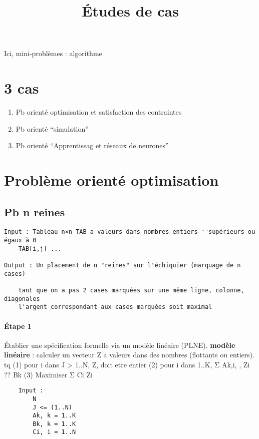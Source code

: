 \documentclass[]{article}
\date{}
\title{Études de cas}
\begin{document}
Ici, mini-problèmes : algorithme

\section{3 cas}\label{cas}

\begin{enumerate}
\def\labelenumi{\arabic{enumi}.}
\tightlist
\item
  Pb orienté optimisation et satisfaction des contraintes
\item
  Pb orienté ``simulation''
\item
  Pb orienté ``Apprentissag et réseaux de neurones''
\end{enumerate}

\section{Problème orienté
optimisation}\label{probluxe8me-orientuxe9-optimisation}

\subsection{Pb n reines}\label{pb-n-reines}

\begin{verbatim}
Input : Tableau n×n TAB a valeurs dans nombres entiers ̛̛supérieurs ou égaux à 0
    TAB[i,j] ...

Output : Un placement de n "reines" sur l'échiquier (marquage de n cases)

    tant que on a pas 2 cases marquées sur une même ligne, colonne, diagonales
    l'argent correspondant aux cases marquées soit maximal
\end{verbatim}

\paragraph{Étape 1}\label{uxe9tape-1}

Établier une spécification formelle via un modèle linéaire (PLNE).
\textbf{modèle linéaire} : calculer un vecteur Z a valeurs dans des
nombres (flottants ou entiers). tq (1) pour i dans J \textgreater{}
1..N, Z, doit etre entier (2) pour i dans 1..K, Σ Ak,i, , Zi ?? Bk (3)
Maximiser Σ Ci Zi

\begin{verbatim}
    Input : 
        N
        J <= (1..N)
        Ak, k = 1..K
        Bk, k = 1..K
        Ci, i = 1..N
\end{verbatim}
\end{document}
